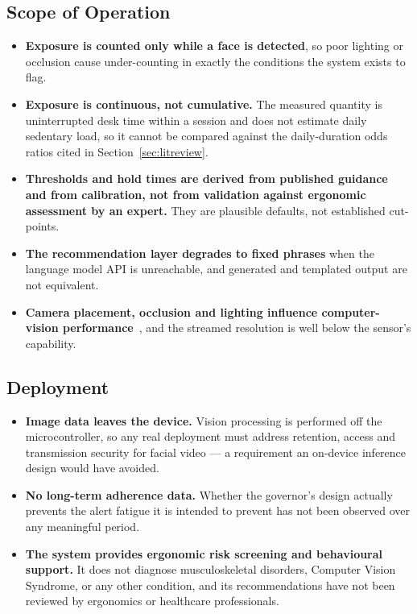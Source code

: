 \subsection{Scope of Operation}

\begin{itemize}
    \item \textbf{Exposure is counted only while a face is detected}, so poor lighting or occlusion
    cause under-counting in exactly the conditions the system exists to flag.
    \item \textbf{Exposure is continuous, not cumulative.} The measured quantity is uninterrupted
    desk time within a session and does not estimate daily sedentary load, so it cannot be compared
    against the daily-duration odds ratios cited in Section~\ref{sec:litreview}.
    \item \textbf{Thresholds and hold times are derived from published guidance and from
    calibration, not from validation against ergonomic assessment by an expert.} They are plausible
    defaults, not established cut-points.
    \item \textbf{The recommendation layer degrades to fixed phrases} when the language model API is
    unreachable, and generated and templated output are not equivalent.
    \item \textbf{Camera placement, occlusion and lighting influence computer-vision
    performance}~\cite{ref16}, and the streamed resolution is well below the sensor's capability.
\end{itemize}

\subsection{Deployment}

\begin{itemize}
    \item \textbf{Image data leaves the device.} Vision processing is performed off the
    microcontroller, so any real deployment must address retention, access and transmission
    security for facial video --- a requirement an on-device inference design would have avoided.
    \item \textbf{No long-term adherence data.} Whether the governor's design actually prevents the
    alert fatigue it is intended to prevent has not been observed over any meaningful period.
    \item \textbf{The system provides ergonomic risk screening and behavioural support.} It does not
    diagnose musculoskeletal disorders, Computer Vision Syndrome, or any other condition, and its
    recommendations have not been reviewed by ergonomics or healthcare professionals.
\end{itemize}

